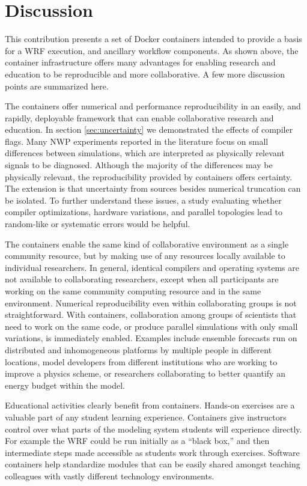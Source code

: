 \documentclass[final]{ametsoc}
\begin{document}
\section{Discussion}\label{sec:discussion}

This contribution presents a set of Docker containers intended to provide a basis for a WRF execution, and ancillary workflow components. As shown above, the container infrastructure offers many advantages for enabling research and education to be reproducible and more collaborative. A few more discussion points are summarized here.

The containers offer numerical and performance reproducibility in an easily, and rapidly, deployable framework that can enable collaborative research and education.  In section \ref{sec:uncertainty} we demonstrated the effects of compiler flags. Many NWP experiments reported in the literature focus on small differences between simulations, which are interpreted as physically relevant signals to be diagnosed. Although the majority of the differences may be physically relevant, the reproducibility provided by containers offers certainty. The extension is that uncertainty from sources besides numerical truncation can be isolated.  To further understand these issues, a study evaluating whether compiler optimizations, hardware variations, and parallel topologies lead to random-like or systematic errors would be helpful.

The containers enable the same kind of collaborative environment as a single community resource, but by making use of any resources locally available to individual researchers. In general, identical compilers and operating systems are not available to collaborating researchers, except when all participants are working on the same community computing resource and in the same environment. Numerical reproducibility even within collaborating groups is not straightforward. With containers, collaboration among groups of scientists that need to work on the same code, or produce parallel simulations with only small variations, is immediately enabled. Examples include ensemble forecasts run on distributed and inhomogeneous platforms by multiple people in different locations, model developers from different institutions who are working to improve a physics scheme, or researchers collaborating to better quantify an energy budget within the model. 

Educational activities clearly benefit from containers. Hands-on exercises are a valuable part of any student learning experience. Containers give instructors control over what parts of the modeling system students will experience directly. For example the WRF could be run initially as a ``black box,'' and then intermediate steps made accessible as students work through exercises. Software containers help standardize modules that can be easily shared amongst teaching colleagues with vastly different technology environments.
\end{document}
